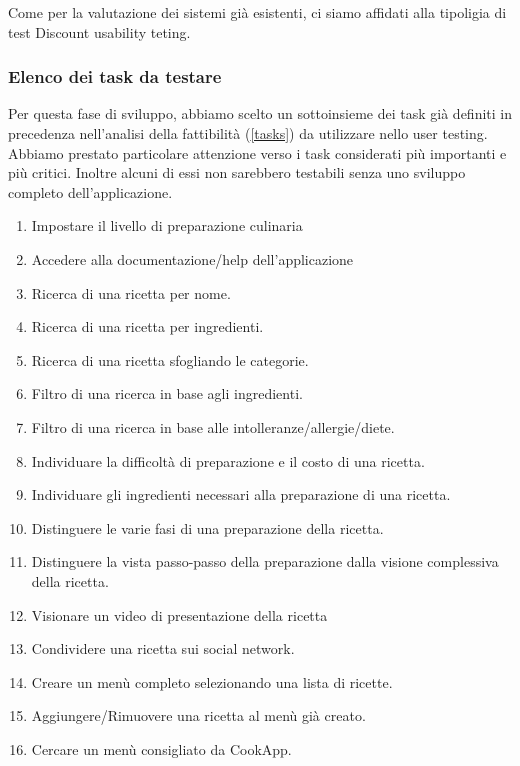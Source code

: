 Come per la valutazione dei sistemi già esistenti, ci siamo affidati
alla tipoligia di test Discount usability teting.

\subsubsection*{Elenco dei task da testare}
Per questa fase di sviluppo, abbiamo scelto un sottoinsieme dei task già definiti in precedenza
nell'analisi della fattibilità (\ref{tasks}) da utilizzare nello user
testing. Abbiamo prestato particolare attenzione verso i task
considerati più importanti e più critici. Inoltre alcuni di essi non
sarebbero testabili senza uno sviluppo completo dell'applicazione.

\begin{enumerate}
\item Impostare il livello di preparazione culinaria
\item Accedere alla documentazione/help dell'applicazione

\item Ricerca di una ricetta per nome.
\item Ricerca di una ricetta per ingredienti.

\item Ricerca di una ricetta sfogliando le categorie.

\item Filtro di una ricerca in base agli ingredienti.
\item Filtro di una ricerca in base alle intolleranze/allergie/diete.

\item Individuare la difficoltà di preparazione e il costo di una ricetta.
\item Individuare gli ingredienti necessari alla preparazione di una ricetta.
\item Distinguere le varie fasi di una preparazione della ricetta.
\item Distinguere la vista passo-passo della preparazione dalla visione complessiva della ricetta.
\item Visionare un video di presentazione della ricetta
\item Condividere una ricetta sui social network.
\item Creare un menù completo selezionando una lista di ricette.
\item Aggiungere/Rimuovere una ricetta al menù già creato.
\item Cercare un menù consigliato da CookApp.


\end{enumerate}
